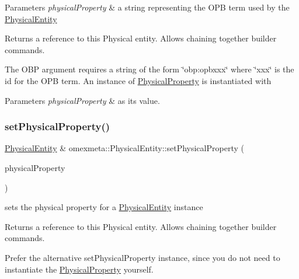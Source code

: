 \begin{DoxyParams}{Parameters}
{\em physical\+Property} & a string representing the O\+PB term used by the \hyperlink{classomexmeta_1_1PhysicalEntity}{Physical\+Entity} \\
\hline
\end{DoxyParams}
\begin{DoxyReturn}{Returns}
a reference to this Physical entity. Allows chaining together builder commands.
\end{DoxyReturn}
The O\+BP argument requires a string of the form \char`\"{}obp\+:opbxxx\char`\"{} where \char`\"{}xxx\char`\"{} is the id for the O\+PB term. An instance of \hyperlink{classomexmeta_1_1PhysicalProperty}{Physical\+Property} is instantiated with 
\begin{DoxyParams}{Parameters}
{\em physical\+Property} & as its value. \\
\hline
\end{DoxyParams}
\mbox{\label{classomexmeta_1_1PhysicalEntity_a9bca0cb13601b6f9617df9f264968f1f}} 
\subsubsection{\texorpdfstring{set\+Physical\+Property()}{setPhysicalProperty()}\hspace{0.1cm}{\footnotesize\ttfamily [2/2]}}
{\footnotesize\ttfamily \hyperlink{classomexmeta_1_1PhysicalEntity}{Physical\+Entity} \& omexmeta\+::\+Physical\+Entity\+::set\+Physical\+Property (\begin{DoxyParamCaption}\item[{\hyperlink{classomexmeta_1_1PhysicalProperty}{Physical\+Property}}]{physical\+Property }\end{DoxyParamCaption})}



sets the physical property for a \hyperlink{classomexmeta_1_1PhysicalEntity}{Physical\+Entity} instance 

\begin{DoxyReturn}{Returns}
a reference to this Physical entity. Allows chaining together builder commands.
\end{DoxyReturn}
Prefer the alternative set\+Physical\+Property instance, since you do not need to instantiate the \hyperlink{classomexmeta_1_1PhysicalProperty}{Physical\+Property} yourself.


